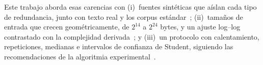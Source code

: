 Este trabajo aborda esas carencias con (i)~fuentes sintéticas que aíslan cada tipo de
redundancia, junto con texto real y los corpus estándar~\cite{arnold1997,deorowicz2003};
(ii)~tamaños de entrada que crecen geométricamente, de $2^{14}$ a $2^{24}$ bytes, y un
ajuste log--log contrastado con la complejidad derivada~\cite{mcgeoch2012}; y (iii)~un
protocolo con calentamiento, repeticiones, medianas e intervalos de confianza de Student,
siguiendo las recomendaciones de la algoritmia experimental~\cite{johnson2002,georges2007}.
